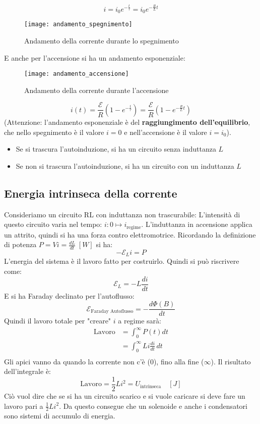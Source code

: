 \documentclass[a4paper]{article}
\begin{document}
\[
  i = i_0 e^{-\frac{t}{\tau}} = i_0 e^{-\frac{R}{L} t}
\] 
\begin{figure}[H]
  \centering
  \texttt{[image: andamento\_spegnimento]}
  \caption{Andamento della corrente durante lo spegnimento}
\end{figure}
E anche per l'accensione si ha un andamento esponenziale:
\begin{figure}[H]
  \centering
  \texttt{[image: andamento\_accensione]}
  \caption{Andamento della corrente durante l'accensione}
\end{figure}
\[
  i(t) = \frac{\mathcal{E}}{R} \left( 1 - e^{-\frac{t}{\tau}} \right) = \frac{\mathcal{E}}{R} \left( 1 - e^{-\frac{R}{L} t} \right)
\] 
(Attenzione: l'andamento esponenziale è del \textbf{raggiungimento dell'equilibrio}, che
nello spegnimento è il valore \( i = 0 \) e nell'accensione è il valore \( i = i_0 \)).
\begin{itemize}
  \item Se si trascura l'autoinduzione, si ha un circuito senza induttanza \( L \)
  \item Se non si trascura l'autoinduzione, si ha un circuito con un induttanza \( L \) 
\end{itemize}


\subsection{Energia intrinseca della corrente}
Consideriamo un circuito RL con induttanza non trascurabile:
\label{04-06-D1}
L'intensità di questo circuito varia nel tempo: \( i: 0 \mapsto i_{\text{regime}} \).
L'induttanza in accensione applica un attrito, quindi si ha una forza contro
elettromotrice. Ricordando la definizione di potenza \( P = Vi = \frac{dL}{dt} \; \left[ W \right] \) si ha:
\[
  -\mathcal{E}_L i = P
\] 
L'energia del sistema è il lavoro fatto per costruirlo. Quindi si può riscrivere come:
\[
  \mathcal{E}_L = - L \frac{di}{dt}
\] 
E si ha Faraday declinato per l'autoflusso:
\[
  \mathcal{E}_{\text{Faraday Autoflusso}} = - \frac{d \Phi (B)}{dt}
\] 
Quindi il lavoro totale per "creare" \( i \) a regime sarà:
\[
  \begin{aligned}
    \text{Lavoro} &= \int_0^\infty P(t) dt\\
      &= \int_0^\infty Li \frac{di}{dt} \, dt\\
  \end{aligned}
\] 
Gli apici vanno da quando la corrente non c'è (\( 0 \)), fino alla fine (\( \infty \)).
Il risultato dell'integrale è:
\[
  \text{Lavoro} = \frac{1}{2} L i^2 = U_{\text{intrinseca}} \quad \left[ J \right]
\] 
Ciò vuol dire che se si ha un circuito scarico e si vuole caricare si deve fare un lavoro
pari a \( \frac{1}{2} Li^2 \). Da questo consegue che un solenoide e anche i condensatori
sono sistemi di accumulo di energia.
\end{document}
